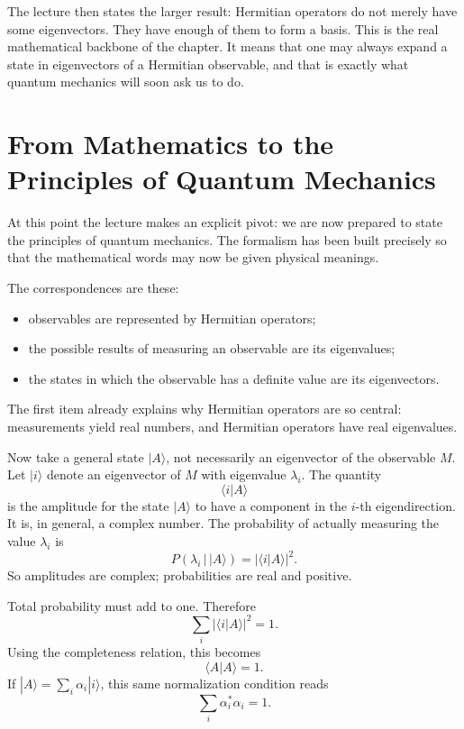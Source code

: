 The lecture then states the larger result: Hermitian operators do not merely have some eigenvectors. They have enough of them to form a basis. This is the real mathematical backbone of the chapter. It means that one may always expand a state in eigenvectors of a Hermitian observable, and that is exactly what quantum mechanics will soon ask us to do.

\section{From Mathematics to the Principles of Quantum Mechanics}

At this point the lecture makes an explicit pivot: we are now prepared to state the principles of quantum mechanics. The formalism has been built precisely so that the mathematical words may now be given physical meanings.

The correspondences are these:
\begin{itemize}
\item observables are represented by Hermitian operators;
\item the possible results of measuring an observable are its eigenvalues;
\item the states in which the observable has a definite value are its eigenvectors.
\end{itemize}

The first item already explains why Hermitian operators are so central: measurements yield real numbers, and Hermitian operators have real eigenvalues.

Now take a general state \(|A\rangle\), not necessarily an eigenvector of the observable \(M\). Let \(|i\rangle\) denote an eigenvector of \(M\) with eigenvalue \(\lambda_i\). The quantity
\begin{equation}
\langle i|A\rangle
\end{equation}
is the amplitude for the state \(|A\rangle\) to have a component in the \(i\)-th eigendirection. It is, in general, a complex number. The probability of actually measuring the value \(\lambda_i\) is
\begin{equation}
P(\lambda_i\,|\,|A\rangle)=|\langle i|A\rangle|^2.
\end{equation}
So amplitudes are complex; probabilities are real and positive.

Total probability must add to one. Therefore
\begin{equation}
\sum_i |\langle i|A\rangle|^2 = 1.
\end{equation}
Using the completeness relation, this becomes
\begin{equation}
\langle A|A\rangle=1.
\end{equation}
If \(|A\rangle=\sum_i \alpha_i |i\rangle\), this same normalization condition reads
\begin{equation}
\sum_i \alpha_i^*\alpha_i=1.
\end{equation}

